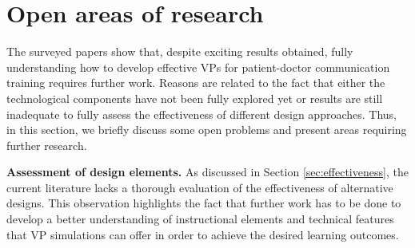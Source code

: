 \section{Open areas of research}
\label{sec:openResearch}

The surveyed papers  show that, despite exciting results obtained, fully understanding how to develop effective VPs for patient-doctor communication training requires further work. Reasons are related to the fact that either the technological components have not been fully explored yet or results are still inadequate to fully assess the effectiveness of different design approaches. Thus, in this section, we briefly discuss some open problems and present areas requiring further research.

\textbf{Assessment of design elements.}
As discussed in Section \ref{sec:effectiveness}, the current literature lacks a thorough evaluation of the effectiveness of alternative designs. This observation highlights the fact that further work has to be done to develop a better understanding of instructional elements and technical features that VP simulations can offer in order to achieve the desired learning outcomes. 


